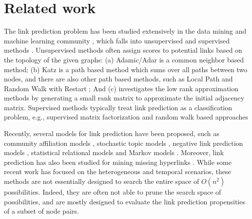 \section{Related work}
\label{sec-related}







The link prediction problem has been studied extensively in the data mining and machine learning community
\cite{kleinberg,linyuan-2011}, which falls into unsupervised and supervised methods \cite{propflow}. Unsupervised methods
often assign scores to potential links based on the topology of the given graphs:
(a) Adamic/Adar \cite{adamic} is a common neighbor based method; (b) Katz \cite{katz-1953} is a
path based method which sums over all paths between two nodes, and there are also other path based
methods, such as Local Path and Random Walk with Restart \cite{linyuan-2011}; And (c)
\cite{kunegis,kleinberg} investigates the low rank approximation methods by generating a
small rank matrix to approximate the initial adjacency matrix. Supervised methods \cite{Link09,propflow,lichen3} typically treat link prediction as a classification problem, e.g., supervised matrix factorization and random walk based approaches \cite{menon,back}


Recently, several models for link prediction have been proposed,
such as  community affiliation models \cite{Yang09,yang-wsdm2013}, stochastic topic models \cite{barbieri2014},
negative link prediction models \cite{tang2015}, statistical relational models \cite{bilgic,Getoor01,Getoor02,Taskar03,yu}
and Markov models \cite{zhu}. Moreover, link prediction has also been studied for mining
missing hyperlinks \cite{adafre,west2015}.
While some recent work has focused on the heterogeneous \cite{qi,sun11,sun12,tang,yang} and temporal \cite{back,dwang} scenarios, these methods are not essentially
designed to search the entire space of $O(n^2)$ possibilities. Indeed, they are often not able to prune the search space of possibilities, and are mostly designed to evaluate the link prediction propensities of a subset of node pairs.



